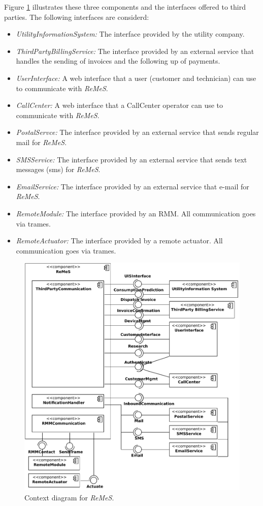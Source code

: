 \documentclass[a4paper,10pt]{article}
\newcommand{\rem}{\emph{ReMeS}\xspace}
\begin{document}
Figure \ref{fig:cc-context} illustrates these three components and the interfaces offered to third parties.
The following interfaces are considerd:
\begin{itemize}
	\item \emph{UtilityInformationSystem:} The interface provided by the utility company.
    \item \emph{ThirdPartyBillingService:} The interface provided by an external service that handles the sending of invoices and the following up of payments.
    \item \emph{UserInterface:} A web interface that a user (customer and technician) can use to communicate with \rem.
    \item \emph{CallCenter:} A web interface that a CallCenter operator can use to communicate with \rem.
    \item \emph{PostalServce:} The interface provided by an external service that sends regular mail for \rem.
    \item \emph{SMSService:} The interface provided by an external service that sends text messages (sms) for \rem.
    \item \emph{EmailService:} The interface provided by an external service that e-mail for \rem.
    \item \emph{RemoteModule:} The interface provided by an RMM. All communication goes via trames.
    \item \emph{RemoteActuator:} The interface provided by a remote actuator. All communication goes via trames.
\end{itemize}


\begin{figure}[!htp]
    \centering
    \includegraphics[width=\textwidth]{Context__Main}
    \caption{Context diagram for \rem.
        }\label{fig:cc-context}
\end{figure}
\end{document}
